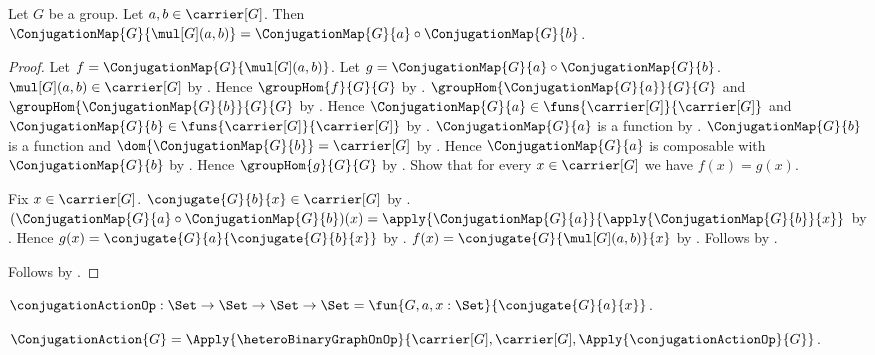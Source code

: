 \begin{theorem}\label{conjugation_map_composition}
    Let $G$ be a group.
    Let $a,b\in\carrier[G]$.
    Then
        $\ConjugationMap{G}{\mul[G](a,b)}=
            \ConjugationMap{G}{a}\circ\ConjugationMap{G}{b}$.
\end{theorem}
\begin{proof}
    Let $f=\ConjugationMap{G}{\mul[G](a,b)}$.
    Let $g=\ConjugationMap{G}{a}\circ\ConjugationMap{G}{b}$.
    $\mul[G](a,b)\in\carrier[G]$ by
        .
    Hence $\groupHom{f}{G}{G}$ by
        .
    $\groupHom{\ConjugationMap{G}{a}}{G}{G}$ and
        $\groupHom{\ConjugationMap{G}{b}}{G}{G}$ by
        .
    Hence $\ConjugationMap{G}{a}\in
        \funs{\carrier[G]}{\carrier[G]}$ and
        $\ConjugationMap{G}{b}\in
        \funs{\carrier[G]}{\carrier[G]}$ by
        .
    $\ConjugationMap{G}{a}$ is a function by
        .
    $\ConjugationMap{G}{b}$ is a function and
        $\dom{\ConjugationMap{G}{b}}=\carrier[G]$ by
        .
    Hence $\ConjugationMap{G}{a}$ is composable with
        $\ConjugationMap{G}{b}$ by
        .
    Hence $\groupHom{g}{G}{G}$ by
        .
    Show that for every $x\in\carrier[G]$ we have $f(x)=g(x)$.
    \begin{subproof}
        Fix $x\in\carrier[G]$.
        $\conjugate{G}{b}{x}\in\carrier[G]$ by
            .
        $(\ConjugationMap{G}{a}\circ\ConjugationMap{G}{b})(x)=
            \apply{\ConjugationMap{G}{a}}{
            \apply{\ConjugationMap{G}{b}}{x}}$ by
            .
        Hence $g(x)=\conjugate{G}{a}{\conjugate{G}{b}{x}}$ by
            .
        $f(x)=\conjugate{G}{\mul[G](a,b)}{x}$ by
            .
        Follows by .
    \end{subproof}
    Follows by .
\end{proof}

\begin{definition}\label{conjugation_action_op}
    $\conjugationActionOp:\Set\to\Set\to\Set\to\Set
        =\fun{G,a,x:\Set}{
            \conjugate{G}{a}{x}}$.
\end{definition}

\begin{definition}\label{conjugation_action}
    $\ConjugationAction{G}=
        \Apply{\heteroBinaryGraphOnOp}
            {\carrier[G],\carrier[G],\Apply{\conjugationActionOp}{G}}$.
\end{definition}

